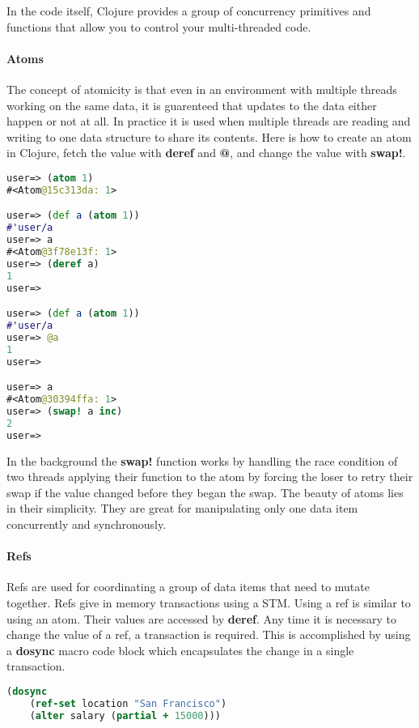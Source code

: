     In the code itself, Clojure provides a group of concurrency primitives and functions that allow you to control your multi-threaded code.
    
    \paragraph{Atoms}
    
    The concept of atomicity is that even in an environment with multiple threads working on the same data, it is guarenteed that updates to the data either happen or not at all. In practice it is used when multiple threads are reading and writing to one data structure to share its contents.
    Here is how to create an atom in Clojure, fetch the value with \textbf{deref} and \textbf{@}, and change the value with \textbf{swap!}. 
    
    \begin{lstlisting}[language=clojure]
user=> (atom 1)
#<Atom@15c313da: 1>

user=> (def a (atom 1))
#'user/a
user=> a
#<Atom@3f78e13f: 1>
user=> (deref a)
1
user=>

user=> (def a (atom 1))
#'user/a
user=> @a
1
user=>

user=> a
#<Atom@30394ffa: 1>
user=> (swap! a inc)
2
user=>
    \end{lstlisting}
    
    In the background the \textbf{swap!} function works by handling the race condition of two threads applying their function to the atom by forcing the loser to retry their swap if the value changed before they began the swap. The beauty of atoms lies in their simplicity. They are great for manipulating only one data item concurrently and synchronously.
    
    \paragraph{Refs}
    
    Refs are used for coordinating a group of data items that need to mutate together. Refs give in memory transactions using a STM. Using a ref is similar to using an atom. Their values are accessed by \textbf{deref}. Any time it is necessary to change the value of a ref, a transaction is required. This is accomplished by using a \textbf{dosync} macro code block which encapsulates the change in a single transaction.
    
    \begin{lstlisting}[language=clojure]
(dosync
    (ref-set location "San Francisco")
	(alter salary (partial + 15000)))    
    \end{lstlisting}
    
